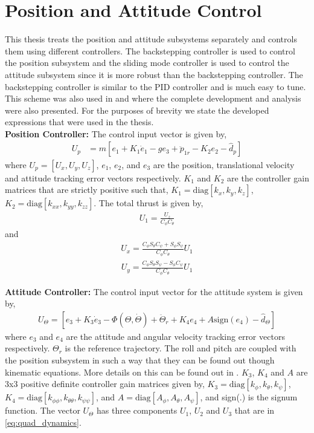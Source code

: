 \documentclass[letterpaper%
, twoside%
, 12pt%
,memoire%
, english%
,creativecommons,hyperref%
]{thETS}
\theoremstyle{newThmStyle}
\begin{document}
\section{Position and Attitude Control} \label{Sec:Control}
This thesis treats the position and attitude subsystems separately and controls them using different controllers. The backstepping controller is used to control the position subsystem and the sliding mode controller is used to control the attitude subsystem since it is more robust than the backstepping controller. The backstepping controller is similar to the PID controller and is much easy to tune. This scheme was also used in \citep{RN114} and \citep{RN117} where the complete development and analysis were also presented. For the purposes of brevity we state the developed expressions that were used in the thesis. \\
\textbf{Position Controller:} The control input vector is given by,
\begin{align}\label{eqn:posCon}
U_p&=m[e_1+K_1\dot{e}_1-ge_3+\ddot{p}_{1r}-K_2e_2-\hat{d}_p]
\end{align}
where $U_p=[U_x,U_y,U_z]$, $e_1$, $e_2$, and $e_3$ are the position, translational velocity and attitude tracking error vectors respectively. $K_1$ and $K_2$ are the controller gain matrices that are strictly positive such that, $K_1=\mbox{diag}[k_x,k_y,k_z]$, $K_2=\mbox{diag}[k_{xx},k_{yy},k_{zz}]$. The total thrust is given by,
\begin{align}
U_1=\frac{U_z}{C_\phi C_\theta} \label{eqn:posCon2}
\end{align}
and 
\begin{align}\label{eqn:posCon3}
U_x=\frac{C_\phi S_\theta C_\psi+S_\phi S_\psi}{C_\phi C_\theta}U_1
\end{align}
\begin{align}\label{eqn:posCon4}
U_y=\frac{C_\phi S_\theta S_\psi-S_\phi C_\psi}{C_\phi C_\theta}U_1
\end{align}



\textbf{Attitude Controller:}
The control input vector for the attitude system is given by,
\begin{align}\label{eqn:attCon}
U_\Theta=[e_3+K_3\dot{e}_3-\Phi(\Theta,\dot{\Theta})+\ddot{\Theta}_{r}+K_4e_4+A \text{sign}(e_4)- \hat{d}_\Theta]
\end{align}
where $e_3$ and $e_4$ are the attitude and angular velocity tracking error vectors respectively. $\Theta_r$ is the reference trajectory. The roll and pitch are coupled with the position subsystem in such a way that they can be found out though kinematic equations. More details on this can be found out in \citep{RN114}. $K_3$, $K_4$ and $A$ are 3x3 positive definite controller gain matrices given by, $K_3=\mbox{diag}[k_{\phi},k_{\theta},k_{\psi}]$, $K_4=\mbox{diag}[k_{\phi \phi},k_{\theta \theta},k_{\psi \psi}]$, and $A=\mbox{diag}[A_\phi,A_\theta,A_\psi]$, and sign(.) is the signum function. The vector $U_\Theta$ has three components $U_1$, $U_2$ and $U_3$ that are in \eqref{eq:quad_dynamics}.
\end{document}
